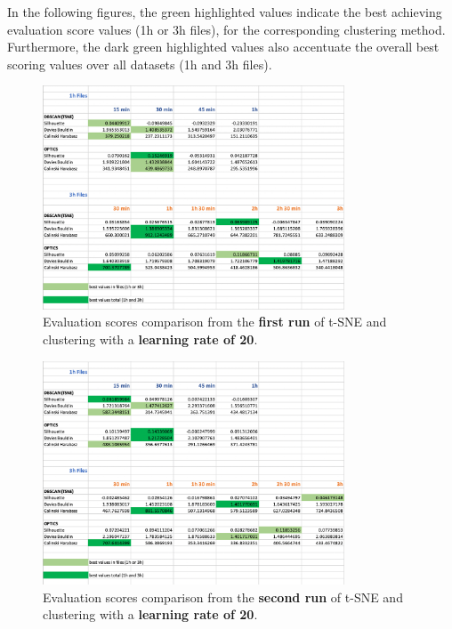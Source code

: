 In the following figures, the green highlighted values indicate the best achieving evaluation score values (1h or 3h files), for the corresponding clustering method. Furthermore, the dark green highlighted values also accentuate the overall best scoring values over all datasets (1h and 3h files).


\begin{figure}[H]
  \centering
  \includegraphics[width=0.8\textwidth]{./images/clusteringResults/clusteringResults1.png}
  \caption{Evaluation scores comparison from the \textbf{first run} of t-SNE and clustering with a \textbf{learning rate of 20}.}
  \label{figure:clusteringResults1}
\end{figure}

\begin{figure}[H]
  \centering
  \includegraphics[width=0.8\textwidth]{./images/clusteringResults/clusteringResults2.png}
  \caption{Evaluation scores comparison from the \textbf{second run} of t-SNE and clustering with a \textbf{learning rate of 20}.}
  \label{figure:clusteringResults2}
\end{figure}


